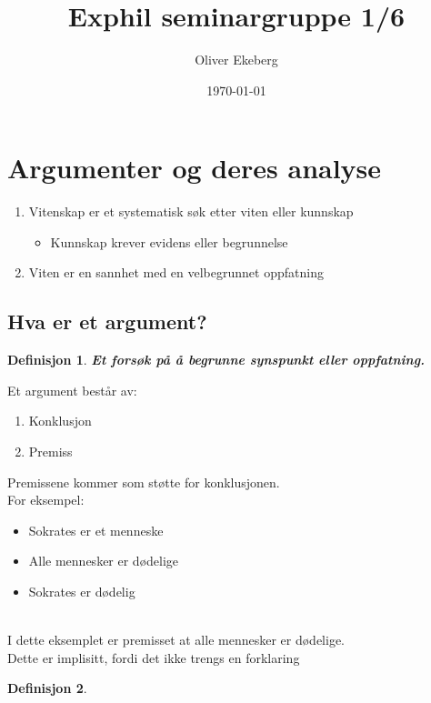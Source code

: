\documentclass[11pt]{article}
\title{Exphil seminargruppe 1/6}
\author{Oliver Ekeberg}
\date{\today}
\newtheorem{definition}{Definisjon}     %
\begin{document}
\maketitle

\section{Argumenter og deres analyse}

\begin{flushleft}
    \begin{enumerate}
        \item Vitenskap er et systematisk søk etter viten eller kunnskap
        \begin{itemize}
            \item Kunnskap krever evidens eller begrunnelse
        \end{itemize}
        \item Viten er en sannhet med en velbegrunnet oppfatning
    \end{enumerate}
\end{flushleft}

\subsection{Hva er et argument?}

\begin{definition}
    \textbf{Et forsøk på å begrunne synspunkt eller oppfatning.}
\end{definition}

Et argument består av:
\begin{enumerate}
    \item Konklusjon
    \item Premiss
\end{enumerate}

Premissene kommer som støtte for konklusjonen.\\  
For eksempel:
\begin{itemize}
    \item Sokrates er et menneske
    \item Alle mennesker er dødelige
    \item Sokrates er dødelig
\end{itemize} 
\\
I dette eksemplet er premisset at alle mennesker er dødelige. \\
Dette er implisitt, fordi det ikke trengs en forklaring

\begin{definition}
    
\end{definition}
\end{document}

